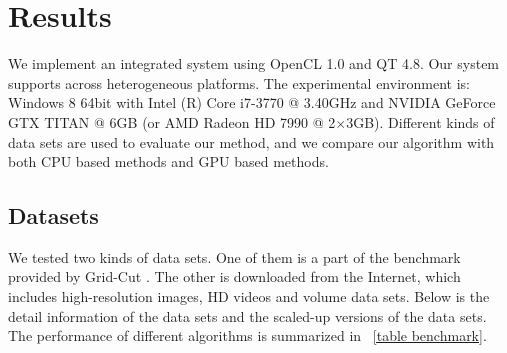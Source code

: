 
\section{Results}
\label{section results}

We implement an integrated system using OpenCL 1.0 and QT 4.8.
Our system supports across heterogeneous platforms.
The experimental environment is: Windows 8 64bit with Intel (R) Core i7-3770 @ 3.40GHz and NVIDIA GeForce GTX TITAN @ 6GB (or AMD Radeon HD 7990 @ 2$\times$3GB).
Different kinds of data sets are used to evaluate our method, and we compare our algorithm with both CPU based methods and GPU based methods.

\subsection{Datasets}

We tested two kinds of data sets.
One of them is a part of the benchmark provided by Grid-Cut \cite{12JSH}.
The other is downloaded from the Internet, which includes high-resolution images, HD videos and volume data sets.
Below is the detail information of the data sets and the scaled-up versions of the data sets.
The performance of different algorithms is summarized in \tablename \ \ref{table benchmark}.


